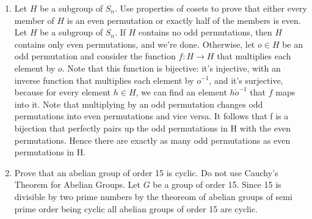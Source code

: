 \documentclass{article}
\begin{document}
\begin{enumerate}
\item Let $H$ be a subgroup of $S_n$. Use properties of cosets to prove that either every member of $H$ is an even permutation or exactly half of the members is even. Let $H$ be a subgroup of $S_n$. If $H$ contains no odd permutations, then $H$ contains only even permutations, and we're done. Otherwise, let $o\in H$ be an odd permutation and consider the function $f:H\rightarrow H$ that multiplies each element by $o$. Note that this function is bijective: it's injective, with an inverse function that multiplies each element by $o^{-1}$, and it's surjective, because for every element $h \in H$, we can find an element $h\dot o^{-1}$ that $f$ maps into it. Note that multiplying by an odd permutation changes odd permutations into even permutations and vice versa. It follows that f is a bijection that perfectly pairs up the odd permutations in H with the even permutations. Hence there are exactly as many odd permutations as even permutations in H.

\item Prove that an abelian group of order 15 is cyclic. Do not use Cauchy's Theorem for Abelian Groups. Let $G$ be a group of order 15. Since 15 is divisible by two prime numbers by the theoreom of abelian groups of semi prime order being cyclic all abelian groups of order 15 are cyclic. 

\end{enumerate}
\end{document}

